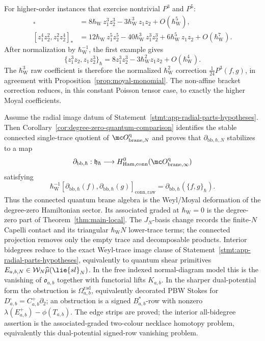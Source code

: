 \documentclass[11pt]{memoir}
\begin{document}
\begin{rmk}
  For higher-order instances that exercise nontrivial $P^3$ and $P^5$:
  \begin{align*}
    [z_1^3z_2,z_1z_2^3]_*
      &=8\hbar_{\mathrm{W}}\,z_1^3z_2^3-3\hbar_{\mathrm{W}}^3\,z_1z_2+O(\hbar_{\mathrm{W}}^5),\\
    [z_1^4z_2^2,z_1^2z_2^4]_*
      &=12\hbar_{\mathrm{W}}\,z_1^5z_2^5-40\hbar_{\mathrm{W}}^3\,z_1^3z_2^3
         +6\hbar_{\mathrm{W}}^5\,z_1z_2+O(\hbar_{\mathrm{W}}^7).
  \end{align*}
  After normalization by \(\hbar_{\mathrm{W}}^{-1}\), the first example gives
  \[
    \{z_1^3z_2,z_1z_2^3\}_\hbar
      =8z_1^3z_2^3-3\hbar_{\mathrm{W}}^2z_1z_2+O(\hbar_{\mathrm{W}}^4).
  \]
  The \(\hbar_{\mathrm{W}}^3\) raw coefficient is therefore the normalized
  \(\hbar_{\mathrm{W}}^2\) correction \(\frac{1}{24}P^3(f,g)\), in agreement with
  Proposition~\ref{prop:moyal-monomial}. The non-affine bracket
  correction reduces, in this constant Poisson tensor case, to exactly
  the higher Moyal coefficients.
\end{rmk}

\begin{rmk}\label{rmk:quantum-hamiltonian-sector}
  Assume the radial image datum of
  Statement~\ref{stmt:app-radial-parts-hypotheses}. Then
  Corollary~\ref{cor:degree-zero-quantum-comparison} identifies the stable
  connected single-trace quotient of
  $\mc O^{\mathrm q}_{\mathrm{brane},N}$ and proves that
  $\partial_{\mathrm{bb},\hbar,N}$ stabilizes to a map
  $$\partial_{\mathrm{bb},\hbar}:\mathfrak h_\hbar\longrightarrow
    H^0_{\mathrm{Ham,conn}}(\mc O^{\mathrm q}_{\mathrm{brane},\infty})$$
  satisfying
  $$\hbar_{\mathrm{W}}^{-1}[\partial_{\mathrm{bb},\hbar}(f),
      \partial_{\mathrm{bb},\hbar}(g)]_{\mathrm{conn,raw}}
    =\partial_{\mathrm{bb},\hbar}(\{f,g\}_\hbar).$$
  Thus the connected quantum brane algebra is the Weyl/Moyal deformation
  of the degree-zero Hamiltonian sector.  Its associated graded at
  \(\hbar_{\mathrm{W}}=0\) is the degree-zero part of
  Theorem~\ref{thm:main-local}.  The \(J_N\)-basis change records the
  finite-\(N\) Capelli contact and its triangular \(\hbar_{\mathrm{W}}N\)
  lower-trace terms; the connected projection removes only the empty
  trace and decomposable products.  Interior bidegrees reduce to the
  exact Weyl-trace image clause of
  Statement~\ref{stmt:app-radial-parts-hypotheses}, equivalently to
  quantum shear primitives
  \(E_{a,b,N}\in\mathcal W_N\widehat\mu(\lie{sl}_N)\).  In the free
  indexed normal-diagram model this is the vanishing of
  \(\mathfrak o_{a,b}\) together with functorial lifts \(K_{a,b}\).  In
  the sharper dual-potential form the obstruction is
  \(\Omega^{\mathrm{rad}}_{a,b}\), equivalently decorated PBW Stokes for
  \(D^\square_{a,b}=C^+_{a,b}\partial_2\); an obstruction is a signed
  \(B_{a,b}^*\)-row with nonzero
  \(\lambda(E^+_{a,b})-\phi(T_{a,b})\).  The edge strips are proved; the
  interior all-bidegree assertion is the associated-graded two-colour
  necklace homotopy problem, equivalently this dual-potential
  signed-row vanishing problem.
\end{rmk}
\end{document}
